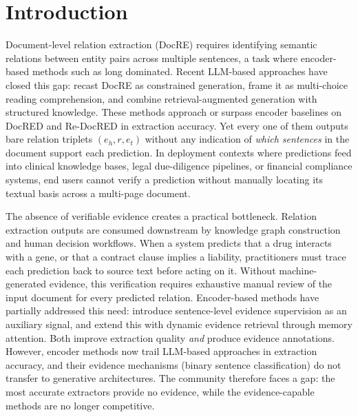 \section{Introduction}

Document-level relation extraction (DocRE) requires identifying semantic relations between entity pairs across multiple sentences, a task where encoder-based methods such as \citet{zhou2021atlop} long dominated.
Recent LLM-based approaches have closed this gap: \citet{wan2024genres} recast DocRE as constrained generation, \citet{xu2024lmrc} frame it as multi-choice reading comprehension, and \citet{chen2025docksrag} combine retrieval-augmented generation with structured knowledge.
These methods approach or surpass encoder baselines on DocRED \citep{yao2019docred} and Re-DocRED \citep{tan2022redocred} in extraction accuracy.
Yet every one of them outputs bare relation triplets $(e_h, r, e_t)$ without any indication of \emph{which sentences} in the document support each prediction.
In deployment contexts where predictions feed into clinical knowledge bases, legal due-diligence pipelines, or financial compliance systems, end users cannot verify a prediction without manually locating its textual basis across a multi-page document.

The absence of verifiable evidence creates a practical bottleneck.
Relation extraction outputs are consumed downstream by knowledge graph construction and human decision workflows.
When a system predicts that a drug interacts with a gene, or that a contract clause implies a liability, practitioners must trace each prediction back to source text before acting on it.
Without machine-generated evidence, this verification requires exhaustive manual review of the input document for every predicted relation.
Encoder-based methods have partially addressed this need: \citet{xiao2022sais} introduce sentence-level evidence supervision as an auxiliary signal, and \citet{ma2023dreeam} extend this with dynamic evidence retrieval through memory attention.
Both improve extraction quality \emph{and} produce evidence annotations.
However, encoder methods now trail LLM-based approaches in extraction accuracy, and their evidence mechanisms (binary sentence classification) do not transfer to generative architectures.
The community therefore faces a gap: the most accurate extractors provide no evidence, while the evidence-capable methods are no longer competitive.

